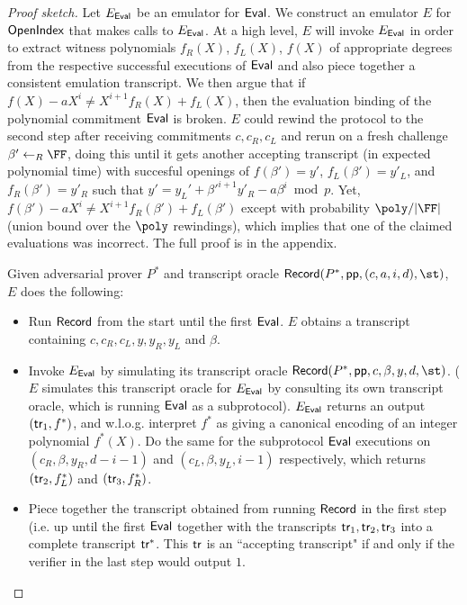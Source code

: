 \begin{proof}[Proof sketch]
Let $E_{\textsf{{Eval}}}$ be an emulator for $\textsf{{Eval}}$. We construct an emulator $E$ for $\textsf{{OpenIndex}}$ that makes calls to $E_{\textsf{{Eval}}}$. At a high level, $E$ will invoke $E_{\textsf{{Eval}}}$ in order to extract witness polynomials $f_R(X)$, $f_L(X)$, $f(X)$ of appropriate degrees from the respective successful executions of $\textsf{{Eval}}$ and also piece together a consistent emulation transcript. We then argue that if $f(X) - a X^i \neq X^{i+1} f_R(X) + f_L(X)$, then the evaluation binding of the polynomial commitment $\textsf{{Eval}}$ is broken. $E$ could rewind the protocol to the second step after receiving commitments $c, c_R, c_L$ and rerun on a fresh challenge $\beta' \leftarrow_R \FF$, doing this until it gets another accepting transcript (in expected polynomial time) with succesful openings of $f(\beta') = y'$, $f_L(\beta') = y'_L$, and $f_R(\beta') = y'_R$ such that $y' = y_L' + \beta'^{i+1} y'_R - a \beta^i \bmod p$. Yet, $f(\beta') - a X^i \neq X^{i+1} f_R(\beta') + f_L(\beta')$ except with probability $\poly / |\FF|$ (union bound over the $\poly$ rewindings), which implies that one of the claimed evaluations was incorrect. The full proof is in the appendix. 


Given adversarial prover $P^*$ and transcript oracle $\pro{Record}(P^*, \params, (c, a, i, d), \st)$, $E$ does the following: 

\begin{itemize} 
\item Run $\textsf{{Record}}$ from the start until the first $\textsf{{Eval}}$. $E$ obtains a transcript containing $c, c_R, c_L, y, y_R, y_L$ and $\beta$. 

\item Invoke $E_{\textsf{{Eval}}}$ by simulating its transcript oracle $\pro{Record}(P^*, \params, c, \beta, y, d, \st)$. ($E$ simulates this transcript oracle for $E_{\textsf{{Eval}}}$ by consulting its own transcript oracle, which is running $\textsf{{Eval}}$ as a subprotocol). $E_{\textsf{{Eval}}}$ returns an output $(\textsf{{tr}}_1, f^*)$, and w.l.o.g. interpret $f^*$ as giving a canonical encoding of an integer polynomial $f^*(X)$. Do the same for the subprotocol $\textsf{{Eval}}$ executions on $(c_R, \beta, y_R, d - i - 1)$ and $(c_L, \beta, y_L, i-1)$ respectively, which returns $(\textsf{{tr}}_2, f_L^*)$ and $(\textsf{{tr}}_3, f_R^*)$. 

\item Piece together the transcript obtained from running $\textsf{{Record}}$ in the first step (i.e. up until the first $\textsf{{Eval}}$ together with the transcripts $\textsf{{tr}}_1, \textsf{{tr}}_2, \textsf{{tr}}_3$ into a complete transcript $\textsf{{tr}}^*$. This $\textsf{{tr}}$ is an ``accepting transcript" if and only if the verifier in the last step would output $1$. 


\end{itemize}
\end{proof}
